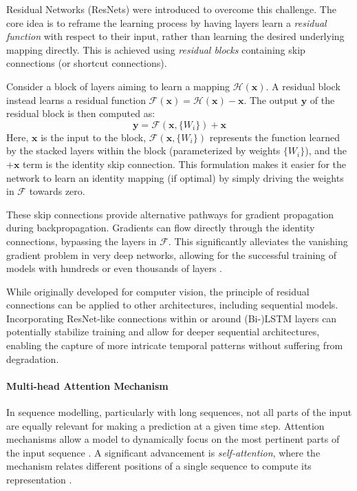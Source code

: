 Residual Networks (ResNets) were introduced to overcome this challenge. The core idea is to reframe the learning process by having layers learn a \textit{residual function} with respect to their input, rather than learning the desired underlying mapping directly. This is achieved using \textit{residual blocks} containing skip connections (or shortcut connections).

Consider a block of layers aiming to learn a mapping \( \mathcal{H}(\bm{x}) \). A residual block instead learns a residual function \( \mathcal{F}(\bm{x}) = \mathcal{H}(\bm{x}) - \bm{x} \). The output \( \bm{y} \) of the residual block is then computed as:
\begin{equation}
  \bm{y} = \mathcal{F}(\bm{x}, \{W_i\}) + \bm{x}
  \label{eq:resnet_block}
\end{equation}
Here, \( \bm{x} \) is the input to the block, \( \mathcal{F}(\bm{x}, \{W_i\}) \) represents the function learned by the stacked layers within the block (parameterized by weights \( \{W_i\} \)), and the \( +\bm{x} \) term is the identity skip connection. This formulation makes it easier for the network to learn an identity mapping (if optimal) by simply driving the weights in \( \mathcal{F} \) towards zero.

These skip connections provide alternative pathways for gradient propagation during backpropagation. Gradients can flow directly through the identity connections, bypassing the layers in \( \mathcal{F} \). This significantly alleviates the vanishing gradient problem in very deep networks, allowing for the successful training of models with hundreds or even thousands of layers \autocite{he2016deep}.

While originally developed for computer vision, the principle of residual connections can be applied to other architectures, including sequential models. Incorporating ResNet-like connections within or around (Bi-)LSTM layers can potentially stabilize training and allow for deeper sequential architectures, enabling the capture of more intricate temporal patterns without suffering from degradation.

\paragraph{\textbf{Multi-head Attention Mechanism}}
\label{sec:attention}

In sequence modelling, particularly with long sequences, not all parts of the input are equally relevant for making a prediction at a given time step. Attention mechanisms allow a model to dynamically focus on the most pertinent parts of the input sequence \autocite{chorowski2014end}. A significant advancement is \textit{self-attention}, where the mechanism relates different positions of a single sequence to compute its representation \autocite{vaswani2017attention}.

